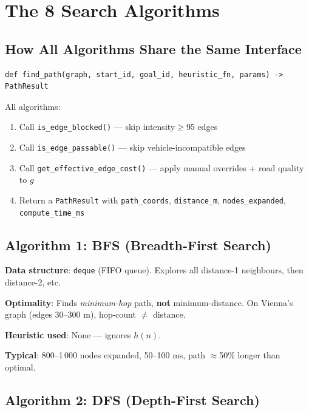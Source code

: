 \documentclass[11pt,a4paper]{article}
\begin{document}
\section{The 8 Search Algorithms}

\subsection{How All Algorithms Share the Same Interface}

\begin{lstlisting}[caption={Every algorithm has this signature}]
def find_path(graph, start_id, goal_id, heuristic_fn, params) -> PathResult
\end{lstlisting}

All algorithms:
\begin{enumerate}[noitemsep]
  \item Call \texttt{is\_edge\_blocked()} — skip intensity$\ge$95 edges
  \item Call \texttt{is\_edge\_passable()} — skip vehicle-incompatible edges
  \item Call \texttt{get\_effective\_edge\_cost()} — apply manual overrides + road quality to $g$
  \item Return a \texttt{PathResult} with \texttt{path\_coords}, \texttt{distance\_m}, \texttt{nodes\_expanded}, \texttt{compute\_time\_ms}
\end{enumerate}

\subsection{Algorithm 1: BFS (Breadth-First Search)}

\textbf{Data structure}: \texttt{deque} (FIFO queue). Explores all distance-1 neighbours, then distance-2, etc.

\textbf{Optimality}: Finds \textit{minimum-hop} path, \textbf{not} minimum-distance. On Vienna's graph (edges 30–300 m), hop-count $\ne$ distance.

\textbf{Heuristic used}: None — ignores $h(n)$.

\textbf{Typical}: 800–1\,000 nodes expanded, 50–100 ms, path $\approx$50\% longer than optimal.

\subsection{Algorithm 2: DFS (Depth-First Search)}
\end{document}
